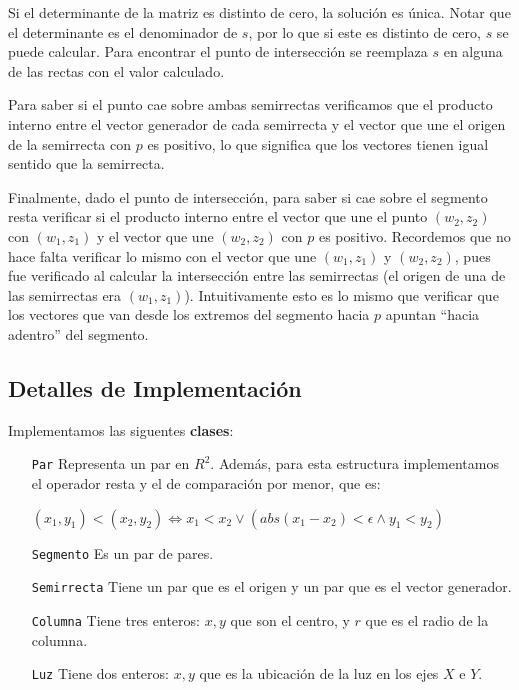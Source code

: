 Si el determinante de la matriz es distinto de cero, la solución es única. Notar
que el determinante es el denominador de $s$, por lo que si este es distinto de
cero, $s$ se puede calcular. Para encontrar el punto de intersección se reemplaza
$s$ en alguna de las rectas con el valor calculado.

Para saber si el punto cae sobre ambas semirrectas verificamos que el producto
interno entre el vector generador de cada semirrecta y el vector que une el
origen de la semirrecta con $p$ es positivo, lo que significa que los vectores
tienen igual sentido que la semirrecta.

Finalmente, dado el punto de intersección, para saber si cae sobre el
segmento resta verificar si el producto interno entre el vector que une el
punto $(w_2, z_2)$ con $(w_1, z_1)$ y el vector que une $(w_2, z_2)$ con $p$
es positivo. Recordemos que no hace falta verificar lo mismo con el vector
que une $(w_1, z_1)$ y $(w_2, z_2)$, pues fue verificado al calcular la
intersección entre las semirrectas (el origen de una de las semirrectas era
$(w_1, z_1)$). Intuitivamente esto es lo mismo que verificar que los vectores
que van desde los extremos del segmento hacia $p$ apuntan ``hacia adentro''
del segmento.


\subsection*{Detalles de Implementación}

Implementamos las siguentes {\bf clases}:

\begin{itemize}
\item[\tt\small Par] Representa un par en $R^2$. Además, para esta
estructura implementamos el operador resta y el de comparación por menor, que es:

$(x_1, y_1) < (x_2, y_2) \Leftrightarrow x_1 < x_2 \vee ( abs(x_1 - x_2) < \epsilon \wedge y_1 < y_2 )$

\item[\tt\small Segmento] Es un par de pares.

\item[\tt\small Semirrecta] Tiene un par que es el origen y un par que es el vector generador.

\item[\tt\small Columna] Tiene tres enteros: $x,y$ que son el centro, y $r$ que es el radio de la columna.

\item[\tt\small Luz] Tiene dos enteros: $x,y$ que es la ubicación de la luz en los ejes $X$ e $Y$.
\end{itemize}

